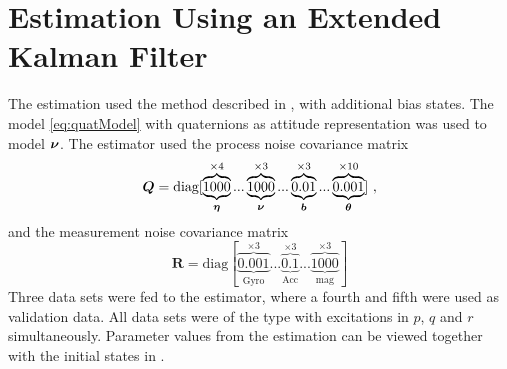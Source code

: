 \section{Estimation Using an Extended Kalman Filter}\label{sec:estimKalman}
The \abbrEKF estimation used the method described in , with additional bias states. The model \eqref{eq:quatModel} with quaternions as attitude representation was used to model $\boldsymbol{\nu}$. The estimator used the process noise covariance matrix
\begin{equation*}
\boldsymbol{Q}=\text{diag}[\underbrace{\overbrace{1000}^{\times4}}_{\boldsymbol{\eta}}... \underbrace{\overbrace{1000}^{\times3}}_{\boldsymbol{\nu}}...\underbrace{\overbrace{0.01}^{\times3}}_{\boldsymbol{b}}... \underbrace{\overbrace{0.001}^{\times10}}_{\boldsymbol{\theta}}]\text{ ,}
\end{equation*}
and the measurement noise covariance matrix
\begin{equation*}
\boldsymbol{R} = \text{diag}[\underbrace{\overbrace{0.001}^{\times3}}_{\text{Gyro}}... \underbrace{\overbrace{0.1}^{\times3}}_{\text{Acc}}... \underbrace{\overbrace{1000}^{\times3}}_{\text{mag}}]
\end{equation*}
Three data sets were fed to the estimator, where a fourth and fifth were used as validation data. All data sets were of the type with excitations in $p$, $q$ and $r$ simultaneously. Parameter values from the estimation can be viewed together with the initial states in .
